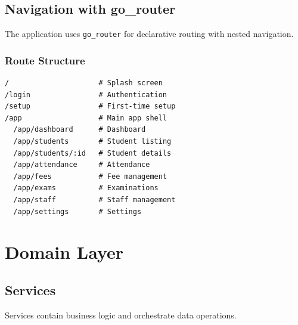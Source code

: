 \documentclass[12pt,a4paper]{report}
\begin{document}
\section{Navigation with go\_router}

The application uses \texttt{go\_router} for declarative routing with nested navigation.

\subsection{Route Structure}

\begin{lstlisting}
/                     # Splash screen
/login                # Authentication
/setup                # First-time setup
/app                  # Main app shell
  /app/dashboard      # Dashboard
  /app/students       # Student listing
  /app/students/:id   # Student details
  /app/attendance     # Attendance
  /app/fees           # Fee management
  /app/exams          # Examinations
  /app/staff          # Staff management
  /app/settings       # Settings
\end{lstlisting}

\chapter{Domain Layer}

\section{Services}

Services contain business logic and orchestrate data operations.

\begin{center}
\end{center}
\end{document}
